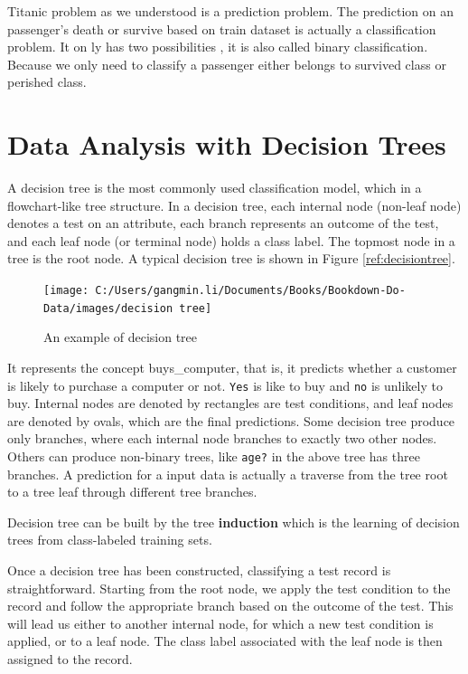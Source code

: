 \documentclass[
]{book}
\begin{document}
Titanic problem as we understood is a prediction problem. The prediction on an passenger's death or survive based on train dataset is actually a classification problem. It on ly has two possibilities , it is also called binary classification. Because we only need to classify a passenger either belongs to survived class or perished class.

\hypertarget{data-analysis-with-decision-trees}{%
\section{Data Analysis with Decision Trees}\label{data-analysis-with-decision-trees}}

A decision tree is the most commonly used classification model, which in a flowchart-like tree structure. In a decision tree, each internal node (non-leaf node) denotes a test on an attribute, each branch represents an outcome of the test, and each leaf node (or terminal node) holds a class label. The topmost node in a tree is the root node. A typical decision tree is shown in Figure \ref{ref:decisiontree}.

\begin{figure}

{\centering \texttt{[image: C:/Users/gangmin.li/Documents/Books/Bookdown-Do-Data/images/decision tree]} 

}

\caption{An example of decision tree}\label{fig:decisiontree}
\end{figure}

It represents the concept buys\_computer, that is, it predicts whether a customer is likely to purchase a computer or not. \texttt{Yes} is like to buy and \texttt{no} is unlikely to buy. Internal nodes are denoted by rectangles are test conditions, and leaf nodes are denoted by ovals, which are the final predictions. Some decision tree produce only branches, where each internal node branches to exactly two other nodes. Others can produce non-binary trees, like \texttt{age?} in the above tree has three branches. A prediction for a input data is actually a traverse from the tree root to a tree leaf through different tree branches.

Decision tree can be built by the tree \textbf{induction} which is the learning of decision trees from class-labeled training sets.

Once a decision tree has been constructed, classifying a test record is straightforward. Starting from the root node, we apply the test condition to the record and follow the appropriate branch based on the outcome of the test. This will lead us either to another internal node, for which a new test condition is applied, or to a leaf node. The class label associated with the leaf node is then assigned to the record.
\end{document}
